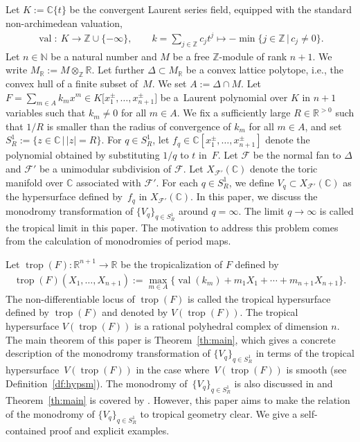 \documentclass[pdftex]{sigma}
\numberwithin{equation}{section}
\begin{document}
Let $K := {\mathbb C}\{t\}$ be the convergent Laurent series f\/ield, equipped with the standard non-archi\-me\-dean valuation,
\begin{gather}\label{eq:val}
\operatorname{val} \colon \ K \longrightarrow {\mathbb Z} \cup \{ - \infty \},\qquad k=\sum_{j \in {\mathbb Z}}c_j t^j \mapsto - \min \{ j \in {\mathbb Z} \,|\, c_j \ne 0 \}.
\end{gather}
Let $n \in {\mathbb N}$ be a natural number and $M$ be a free ${\mathbb Z}$-module of rank $n+1$. We write $M_{\mathbb R}:=M \otimes_{\mathbb Z} {\mathbb R}$.
Let further $\Delta \subset M_{\mathbb R}$ be a convex lattice polytope, i.e., the convex hull of a f\/inite subset of~$M$. We set $A:= \Delta \cap M$.
Let $F=\sum\limits_{m \in A} k_m x^m \in K\big[x^\pm_{1},\dots,x^\pm_{n+1}\big]$ be a~Laurent polynomial over $K$ in $n+1$ variables such that $k_m \neq 0$ for all $m \in A$. We f\/ix a suf\/f\/iciently large $R \in {\mathbb R}^{>0}$ such that $1/R$ is smaller than the radius of convergence of $k_m$ for all $m \in A$, and set $S_R^1 := \{ z \in {\mathbb C} \,|\, |z|=R \}$. For $q \in S_R^1$, let $f_q \in {\mathbb C}[x^\pm_{1},\dots,x^\pm_{n+1}]$ denote the polynomial obtained by substituting $1/q$ to $t$ in~$F$. Let ${\mathcal F}$ be the normal fan to $\Delta$ and ${\mathcal F}'$ be a unimodular subdivision of ${\mathcal F}$. Let $X_{{\mathcal F}'}({\mathbb C})$ denote the toric manifold over ${\mathbb C}$ associated with ${\mathcal F}'$. For each $q \in S_R^1$, we def\/ine $V_q \subset X_{{\mathcal F}'}({\mathbb C})$ as the hypersurface def\/ined by~$f_q$ in $X_{{\mathcal F}'}({\mathbb C})$. In this paper, we discuss the monodromy transformation of $\{V_q\}_{q \in S_R^1}$ around $q=\infty$. The limit $q \to \infty$ is called the tropical limit in this paper. The motivation to address this problem comes from the calculation of monodromies of period maps.

Let $\operatorname{trop}(F) \colon {\mathbb R}^{n+1} \to {\mathbb R}$ be the tropicalization of $F$ def\/ined by
\begin{gather}\label{eq:trp}
\operatorname{trop}(F)(X_1, \dots , X_{n+1}):=\max_{m \in A} \big\{{\operatorname{val}}(k_m)+m_1X_1+ \cdots +m_{n+1}X_{n+1} \big\}.
\end{gather}
The non-dif\/ferentiable locus of $\operatorname{trop}(F)$ is called the tropical hypersurface def\/ined by $\operatorname{trop}(F)$
and denoted by $V(\operatorname{trop}(F))$. The tropical hypersurface $V(\operatorname{trop}(F))$ is a rational polyhedral complex of dimension $n$.
The main theorem of this paper is Theorem~\ref{th:main}, which gives a concrete description of the monodromy transformation of $\{V_q\}_{q \in S_R^1}$ in terms of the tropical hypersur\-fa\-ce~$V(\operatorname{trop}(F))$ in the case where~$V(\operatorname{trop}(F))$ is smooth (see Def\/inition~\ref{df:hypsm}). The monodromy of~$\{V_q\}_{q \in S_R^1}$ is also discussed in \cite[Appendix~B.2]{DKK} and Theorem~\ref{th:main} is covered by \cite[Proposition~B.17]{DKK}. However, this paper aims to make the relation of the monodromy of $\{V_q\}_{q \in S_R^1}$ to tropical geometry clear. We give a self-contained proof and explicit examples.
\end{document}
